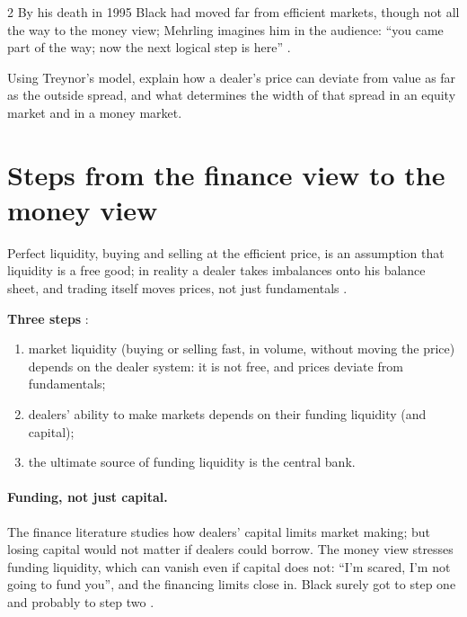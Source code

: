 \begin{paracol}{2}
By his death in 1995 Black had moved far from efficient markets, though not all the way to the money view; Mehrling imagines him in the audience: ``you came part of the way;
now the next logical step is here'' .

\begin{exercise}
Using Treynor's model, explain how a dealer's price can deviate from value as far as the outside spread, and what determines the width of that spread in an equity market and
in a money market.
\end{exercise}

\section{Steps from the finance view to the money view}\label{sec:tv-steps}

Perfect liquidity, buying and selling at the efficient price, is an assumption that liquidity is a free good; in reality a dealer takes imbalances onto his balance sheet, and
trading itself moves prices, not just fundamentals .

\begin{keyformulas}
\textbf{Three steps} :
\begin{enumerate}
  \item market liquidity (buying or selling fast, in volume, without moving the price) depends on the dealer system: it is not free, and prices deviate from fundamentals;
  \item dealers' ability to make markets depends on their funding liquidity (and capital);
  \item the ultimate source of funding liquidity is the central bank.
\end{enumerate}
\end{keyformulas}

\paragraph{Funding, not just capital.} The finance literature studies how dealers' capital limits market making; but losing capital would not matter if dealers could borrow. The
money view stresses funding liquidity, which can vanish even if capital does not: ``I'm scared, I'm not going to fund you'', and the financing limits close in. Black surely got to
step one and probably to step two .


\end{paracol}
